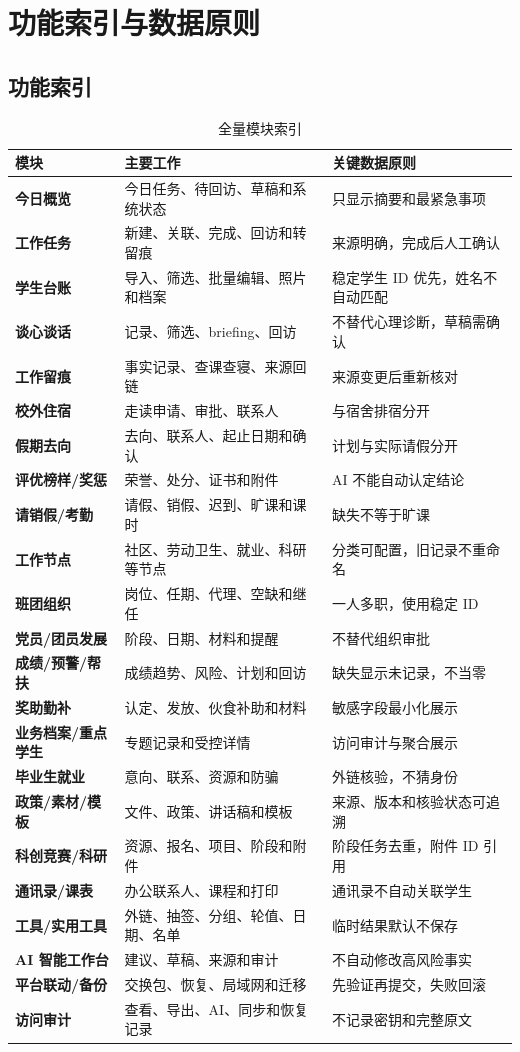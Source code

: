 \documentclass[UTF8,zihao=-4,oneside]{ctexrep}
\begin{document}
\chapter{功能索引与数据原则}

\section{功能索引}

\small
\begin{longtable}{>{\bfseries}p{32mm} p{46mm} p{59mm}}
\caption{全量模块索引}\\
\toprule
模块 & 主要工作 & 关键数据原则 \\
\midrule
今日概览 & 今日任务、待回访、草稿和系统状态 & 只显示摘要和最紧急事项 \\
工作任务 & 新建、关联、完成、回访和转留痕 & 来源明确，完成后人工确认 \\
学生台账 & 导入、筛选、批量编辑、照片和档案 & 稳定学生 ID 优先，姓名不自动匹配 \\
谈心谈话 & 记录、筛选、briefing、回访 & 不替代心理诊断，草稿需确认 \\
工作留痕 & 事实记录、查课查寝、来源回链 & 来源变更后重新核对 \\
校外住宿 & 走读申请、审批、联系人 & 与宿舍排宿分开 \\
假期去向 & 去向、联系人、起止日期和确认 & 计划与实际请假分开 \\
评优榜样/奖惩 & 荣誉、处分、证书和附件 & AI 不能自动认定结论 \\
请销假/考勤 & 请假、销假、迟到、旷课和课时 & 缺失不等于旷课 \\
工作节点 & 社区、劳动卫生、就业、科研等节点 & 分类可配置，旧记录不重命名 \\
班团组织 & 岗位、任期、代理、空缺和继任 & 一人多职，使用稳定 ID \\
党员/团员发展 & 阶段、日期、材料和提醒 & 不替代组织审批 \\
成绩/预警/帮扶 & 成绩趋势、风险、计划和回访 & 缺失显示未记录，不当零 \\
奖助勤补 & 认定、发放、伙食补助和材料 & 敏感字段最小化展示 \\
业务档案/重点学生 & 专题记录和受控详情 & 访问审计与聚合展示 \\
毕业生就业 & 意向、联系、资源和防骗 & 外链核验，不猜身份 \\
政策/素材/模板 & 文件、政策、讲话稿和模板 & 来源、版本和核验状态可追溯 \\
科创竞赛/科研 & 资源、报名、项目、阶段和附件 & 阶段任务去重，附件 ID 引用 \\
通讯录/课表 & 办公联系人、课程和打印 & 通讯录不自动关联学生 \\
工具/实用工具 & 外链、抽签、分组、轮值、日期、名单 & 临时结果默认不保存 \\
AI 智能工作台 & 建议、草稿、来源和审计 & 不自动修改高风险事实 \\
平台联动/备份 & 交换包、恢复、局域网和迁移 & 先验证再提交，失败回滚 \\
访问审计 & 查看、导出、AI、同步和恢复记录 & 不记录密钥和完整原文 \\
\bottomrule
\end{longtable}
\normalsize
\end{document}
